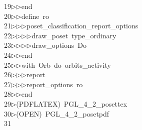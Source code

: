 \begin{tabbing}
19\>$\triangleright$\>$\triangleright$\>end\ \\[0pt]
20\>$\triangleright$\>$\triangleright$\>define\ ro\ \\[0pt]
21\>$\triangleright$\>$\triangleright$\>$\triangleright$\>poset\_classification\_report\_options\ \\[0pt]
22\>$\triangleright$\>$\triangleright$\>$\triangleright$\>$\triangleright$\>draw\_poset\ type\_ordinary\ \\[0pt]
23\>$\triangleright$\>$\triangleright$\>$\triangleright$\>$\triangleright$\>draw\_options\ Do\ \\[0pt]
24\>$\triangleright$\>$\triangleright$\>end\ \\[0pt]
25\>$\triangleright$\>$\triangleright$\>with\ Orb\ do\ orbits\_activity\ \\[0pt]
26\>$\triangleright$\>$\triangleright$\>$\triangleright$\>report\ \ \\[0pt]
27\>$\triangleright$\>$\triangleright$\>$\triangleright$\>report\_options\ ro\ \\[0pt]
28\>$\triangleright$\>$\triangleright$\>end\ \\[0pt]
29\>$\triangleright$\>(PDFLATEX)\ PGL\_4\_2\_posettex\\[0pt]
30\>$\triangleright$\>(OPEN)\ PGL\_4\_2\_posetpdf\\[0pt]
31\>\end{tabbing}

